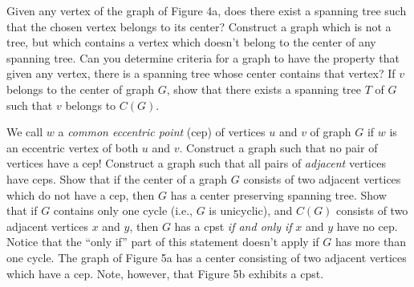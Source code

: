 \documentclass{article}
\begin{document}
\begin{description}
  Given any vertex of the graph of Figure 4a, does there exist a spanning tree such that the chosen vertex belongs to its center? Construct a graph which is not a tree, but which contains a vertex which doesn't belong to the center of any spanning tree. Can you determine criteria for a graph to have the property that given any vertex, there is a spanning tree whose center contains that vertex? If $v$ belongs to the center of graph $G$, show that there exists a spanning tree $T$ of $G$ such that $v$ belongs to $C(G)$.

\item[10.] We call $w$ a \emph{common eccentric point} (cep) of vertices $u$ and $v$ of graph $G$ if $w$ is an eccentric vertex of both $u$ and $v$. Construct a graph such that no pair of vertices have a cep! Construct a graph such that all pairs of \emph{adjacent} vertices have ceps. Show that if the center of a graph $G$ consists of two adjacent vertices which do not have a cep, then $G$ has a center preserving spanning tree. Show that if $G$ contains only one cycle (i.e., $G$ is unicyclic), and $C(G)$ consists of two adjacent vertices $x$ and $y$, then $G$ has a cpst \emph{if and only if} $x$ and $y$ have no cep. Notice that the ``only if'' part of this statement doesn't apply if $G$ has more than one cycle. The graph of Figure 5a has a center consisting of two adjacent vertices which have a cep. Note, however, that Figure 5b exhibits a cpst.


\end{description}
\end{document}
